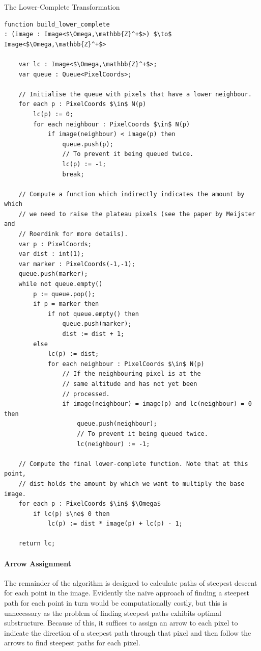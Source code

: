 \begin{stulisting}[p]
\caption{The Lower-Complete Transformation}
\label{code:segmentation-watershed-lowercomplete}
\begin{lstlisting}[style=Default]
function build_lower_complete
: (image : Image<$\Omega,\mathbb{Z}^+$>) $\to$ Image<$\Omega,\mathbb{Z}^+$>

	var lc : Image<$\Omega,\mathbb{Z}^+$>;
	var queue : Queue<PixelCoords>;

	// Initialise the queue with pixels that have a lower neighbour.
	for each p : PixelCoords $\in$ N(p)
		lc(p) := 0;
		for each neighbour : PixelCoords $\in$ N(p)
			if image(neighbour) < image(p) then
				queue.push(p);
				// To prevent it being queued twice.
				lc(p) := -1;
				break;

	// Compute a function which indirectly indicates the amount by which
	// we need to raise the plateau pixels (see the paper by Meijster and
	// Roerdink for more details).
	var p : PixelCoords;
	var dist : int(1);
	var marker : PixelCoords(-1,-1);
	queue.push(marker);
	while not queue.empty()
		p := queue.pop();
		if p = marker then
			if not queue.empty() then
				queue.push(marker);
				dist := dist + 1;
		else
			lc(p) := dist;
			for each neighbour : PixelCoords $\in$ N(p)
				// If the neighbouring pixel is at the
				// same altitude and has not yet been
				// processed.
				if image(neighbour) = image(p) and lc(neighbour) = 0 then
					queue.push(neighbour);
					// To prevent it being queued twice.
					lc(neighbour) := -1;
	
	// Compute the final lower-complete function. Note that at this point,
	// dist holds the amount by which we want to multiply the base image.
	for each p : PixelCoords $\in$ $\Omega$
		if lc(p) $\ne$ 0 then
			lc(p) := dist * image(p) + lc(p) - 1;

	return lc;
\end{lstlisting}
\end{stulisting}

\paragraph{Arrow Assignment}

The remainder of the algorithm is designed to calculate paths of steepest descent for each point in the image. Evidently the na\"ive approach of finding a steepest path for each point in turn would be computationally costly, but this is unnecessary as the problem of finding steepest paths exhibits optimal substructure. Because of this, it suffices to assign an arrow to each pixel to indicate the direction of a steepest path through that pixel and then follow the arrows to find steepest paths for each pixel.

